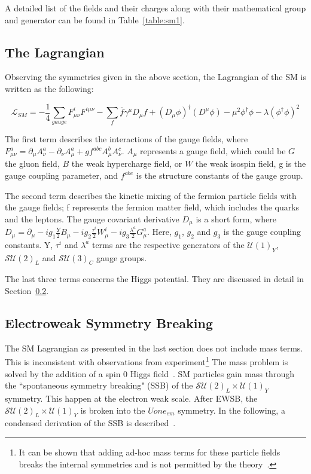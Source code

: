    A detailed list of the fields and their charges along with their mathematical group and generator can be found in Table~\ref{table:sm1}.

\subsection{The Lagrangian}

Observing the symmetries given in the above section, the Lagrangian of the SM is written as the following:

\begin{equation}
    \mathcal{L}_{SM}= - \frac{1}{4} \sum\limits_{gauge} F^{i}_{\mu \nu}F^{i\mu\nu} - \sum\limits_{f} \overline{f} \gamma^{\mu} D_{\mu} f +(D_{\mu}\phi)^{\dagger}(D^{\mu}\phi) - \mu^{2}\phi^{\dagger}\phi - \lambda(\phi^{\dagger}\phi)^{2}
    \label{eq:SMLagrangian}
\end{equation}

The first term describes the interactions of the gauge fields, where $F^{a}_{\mu\nu}=\partial_{\mu}A_{\nu}^{a}-\partial_{\nu}A_{\mu}^{a}+g f^{abc}A^{b}_{\mu}A^{c}_{\nu}$. $A_{\mu}$ represents a gauge field, which could be $G$ the gluon field, $B$ the weak hypercharge field, or $W$ the weak isospin field, g is the gauge coupling parameter, and $f^{abc}$ is the structure constants of the gauge group. 

The second term describes the kinetic mixing of the fermion particle fields with the gauge fields; f represents the fermion matter field, which includes the quarks and the leptons. The gauge covariant derivative $D_{\mu}$ is a short form, where $D_{\mu}=\partial_{\mu}-i g_{1} \frac{Y}{2}B_{\mu} - i g_{2}\frac{\tau ^{i}}{2}W_{\mu}^{i} - ig_{3}\frac{\lambda^{a}}{2}G^{a}_{\mu}$. Here, $g_{1}$, $g_{2}$ and $g_{3}$ is the gauge coupling constants. Y, $\tau ^{i}$ and $\lambda^{a}$ terms are the respective generators of the $\mathcal{U}(1)_{Y}$, $\mathcal{SU}(2)_{L}$ and $\mathcal{SU}(3)_{C}$ gauge groups.

The last three terms concerns the Higgs potential. They are discussed in detail in Section~\ref{sec:SSB}.

\subsection{Electroweak Symmetry Breaking}
\label{sec:SSB}
The SM Lagrangian as presented in the last section does not include mass terms. This is inconsistent with observations from experiment\footnote{It can be shown that adding ad-hoc mass terms for these particle fields breaks the internal symmetries and is not permitted by the theory~\cite{peskin2018introduction}.} The mass problem is solved by the addition of a spin 0 Higgs field~\cite{higgs1964broken}. SM particles gain mass through the ``spontaneous symmetry breaking" (SSB) of the $\mathcal{SU}(2)_{L} \times \mathcal{U}(1)_{Y}$ symmetry. This happen at the electron weak scale. After EWSB, the $\mathcal{SU}(2)_{L} \times \mathcal{U}(1)_{Y}$ is broken into the $Uone_{em}$ symmetry. In the following, a condensed derivation of the SSB is described~\cite{peskin2018introduction}.


